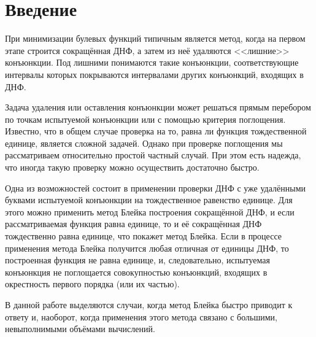 \documentclass[12pt,a4paper,oneside,fleqn,leqno]{article}
\theoremstyle{definition}
\begin{document}
\newpage
\renewcommand{\contentsname}{Содержание}
\tableofcontents


\newpage
\section*{Введение}
	При минимизации булевых функций типичным является метод, когда на первом этапе строится сокращённая ДНФ, а затем из неё удаляются <<лишние>> конъюнкции. Под лишними понимаются такие конъюнкции, соответствующие интервалы которых покрываются интервалами других конъюнкций, входящих в ДНФ.\par
	Задача удаления или оставления конъюнкции может решаться прямым перебором по точкам испытуемой конъюнкции или с помощью критерия поглощения. Известно, что в общем случае проверка на то, равна ли функция тождественной единице, является сложной задачей. Однако при проверке поглощения мы рассматриваем относительно простой частный случай. При этом есть надежда, что иногда такую проверку можно осуществить достаточно быстро.\par
	Одна из возможностей состоит в применении проверки ДНФ с уже удалёнными буквами испытуемой конъюнкции на тождественное равенство единице. Для этого можно применить метод Блейка построения сокращённой ДНФ, и если рассматриваемая функция равна единице, то и её сокращённая ДНФ тождественно равна единице, что покажет метод Блейка. Если в процессе применения метода Блейка получится любая отличная от единицы ДНФ, то построенная функция не равна единице, и, следовательно, испытуемая конъюнкция не поглощается совокупностью конъюнкций, входящих в окрестность первого порядка (или их частью).\par
	В данной работе выделяются случаи, когда метод Блейка быстро приводит к ответу и, наоборот, когда применения этого метода связано с большими, невыполнимыми объёмами вычислений.
\end{document}
